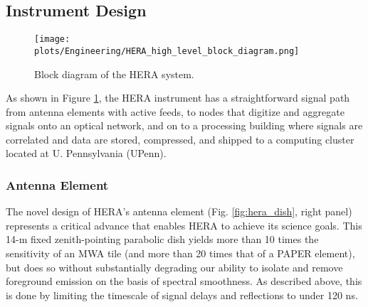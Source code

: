 \documentclass[preprint]{aastex}
\newcommand{\compress}{\vspace{-0.25in}}
\newcommand{\Caption}[4]{\vspace{#1}\renewcommand{\baselinestretch}{#2}\caption{#4}\vspace{#3}}
\begin{document}
\compress
\subsection{Instrument Design}
\label{InstDes}
%
%

\begin{figure}[t]
\centering
\texttt{[image: plots/Engineering/HERA\_high\_level\_block\_diagram.png]}
\Caption{-0.75in}{0.99}{0in}{\small
Block diagram of the HERA system.}
\label{fig:blockDiagram} 
\end{figure}

As shown in Figure \ref{fig:blockDiagram}, the HERA instrument has a straightforward signal
path from antenna elements
with active feeds, to nodes that digitize and aggregate signals onto an optical network,
and on to a processing building where signals are correlated and data are stored, compressed,
and shipped to a computing cluster located at U. Pennsylvania (UPenn). 

\compress
\subsubsection{Antenna Element}

The novel design of HERA's antenna element
(Fig. \ref{fig:hera_dish}, right panel) represents a critical advance
that enables HERA to achieve its science goals.  This 14-m
fixed zenith-pointing parabolic dish yields more than 10 times the
sensitivity of an MWA tile (and more than 20 times
that of a PAPER element), but does so without substantially degrading
our ability to isolate and remove foreground emission on the basis of
spectral smoothness.  As described above, this is done by limiting
the timescale of signal delays and reflections to under 120 ns.
\end{document}

